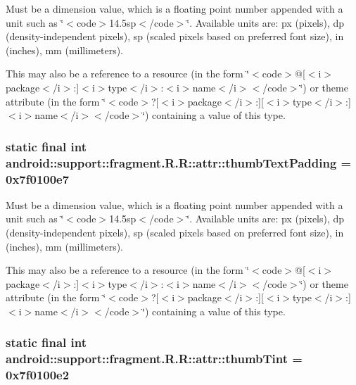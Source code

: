 Must be a dimension value, which is a floating point number appended with a unit such as \char`\"{}$<$code$>$14.5sp$<$/code$>$\char`\"{}. Available units are: px (pixels), dp (density-independent pixels), sp (scaled pixels based on preferred font size), in (inches), mm (millimeters). 

This may also be a reference to a resource (in the form \char`\"{}$<$code$>$@\mbox{[}$<$i$>$package$<$/i$>$:\mbox{]}$<$i$>$type$<$/i$>$:$<$i$>$name$<$/i$>$$<$/code$>$\char`\"{}) or theme attribute (in the form \char`\"{}$<$code$>$?\mbox{[}$<$i$>$package$<$/i$>$:\mbox{]}\mbox{[}$<$i$>$type$<$/i$>$:\mbox{]}$<$i$>$name$<$/i$>$$<$/code$>$\char`\"{}) containing a value of this type. \hypertarget{classandroid_1_1support_1_1fragment_1_1_r_1_1attr_1605da962b67872f5e2b7294afbb8c13}{
\subsubsection[{thumbTextPadding}]{\setlength{\rightskip}{0pt plus 5cm}static final int android::support::fragment.R.R::attr::thumbTextPadding = 0x7f0100e7}}
\label{classandroid_1_1support_1_1fragment_1_1_r_1_1attr_1605da962b67872f5e2b7294afbb8c13}


Must be a dimension value, which is a floating point number appended with a unit such as \char`\"{}$<$code$>$14.5sp$<$/code$>$\char`\"{}. Available units are: px (pixels), dp (density-independent pixels), sp (scaled pixels based on preferred font size), in (inches), mm (millimeters). 

This may also be a reference to a resource (in the form \char`\"{}$<$code$>$@\mbox{[}$<$i$>$package$<$/i$>$:\mbox{]}$<$i$>$type$<$/i$>$:$<$i$>$name$<$/i$>$$<$/code$>$\char`\"{}) or theme attribute (in the form \char`\"{}$<$code$>$?\mbox{[}$<$i$>$package$<$/i$>$:\mbox{]}\mbox{[}$<$i$>$type$<$/i$>$:\mbox{]}$<$i$>$name$<$/i$>$$<$/code$>$\char`\"{}) containing a value of this type. \hypertarget{classandroid_1_1support_1_1fragment_1_1_r_1_1attr_8d288b4e4b38bce8cb8b6e968d67b924}{
\subsubsection[{thumbTint}]{\setlength{\rightskip}{0pt plus 5cm}static final int android::support::fragment.R.R::attr::thumbTint = 0x7f0100e2}}
\label{classandroid_1_1support_1_1fragment_1_1_r_1_1attr_8d288b4e4b38bce8cb8b6e968d67b924}


